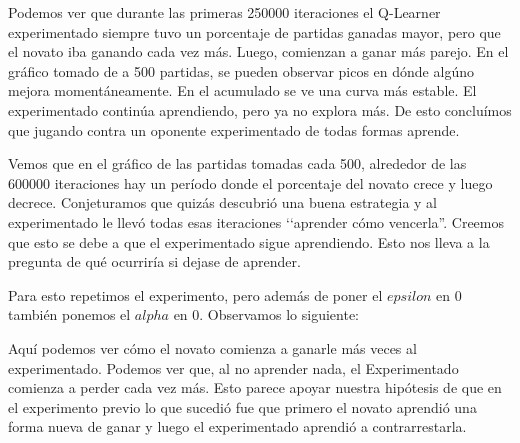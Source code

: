 Podemos ver que durante las primeras 250000 iteraciones el Q-Learner experimentado siempre tuvo un porcentaje de partidas ganadas mayor, pero que el novato iba ganando cada vez más. Luego, comienzan a ganar más parejo. En el gráfico tomado de a 500 partidas, se pueden observar picos en dónde algúno mejora momentáneamente. En el acumulado se ve una curva más estable. El experimentado continúa aprendiendo, pero ya no explora más. De esto concluímos que jugando contra un oponente experimentado de todas formas aprende.

Vemos que en el gráfico de las partidas tomadas cada 500, alrededor de las 600000 iteraciones hay un período donde el porcentaje del novato crece y luego decrece. Conjeturamos que quizás descubrió una buena estrategia y al experimentado le llevó todas esas iteraciones ‘‘aprender cómo vencerla''. Creemos que esto se debe a que el experimentado sigue aprendiendo. Esto nos lleva a la pregunta de qué ocurriría si dejase de aprender.

Para esto repetimos el experimento, pero además de poner el $epsilon$ en 0 también ponemos el $alpha$ en 0. Observamos lo siguiente:



Aquí podemos ver cómo el novato comienza a ganarle más veces al experimentado. Podemos ver que, al no aprender nada, el Experimentado comienza a perder cada vez más. Esto parece apoyar nuestra hipótesis de que en el experimento previo lo que sucedió fue que primero el novato aprendió una forma nueva de ganar y luego el experimentado aprendió a contrarrestarla.
